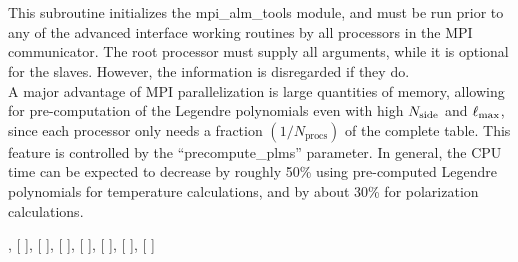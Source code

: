 
\sloppy


 \section[mpi\_initialize\_alm\_tools]{ }
\label{sub:mpi_initialize_alm_tools}
\author{Hans K. Eriksen}

\begin{facility}
{This subroutine initializes the mpi\_alm\_tools module, and must be
run prior to any of the advanced interface working routines by all
processors in the MPI communicator. The root processor must supply all arguments, 
while it is optional for the slaves. However, the information is disregarded 
if they do.\\
A major advantage of MPI parallelization is large quantities
of memory, allowing for pre-computation of the Legendre 
polynomials even with high $N_{\mathrm{side}}$ and
$\ell_{\mathrm{max}}$, since each processor only needs a fraction
$(1/N_{\mathrm{procs}})$ of the complete table. This feature is
controlled by the ``precompute\_plms'' parameter. In general, the CPU
time can be expected to decrease by roughly 50\% using pre-computed
Legendre polynomials for temperature calculations, and by about 30\%
for polarization calculations.
}
{\modMpiAlmTools}
\end{facility}

\begin{f90format}
{%
, [%
], [%
], [%
], [%
], [%
], [%
], [%
]}
\end{f90format}

